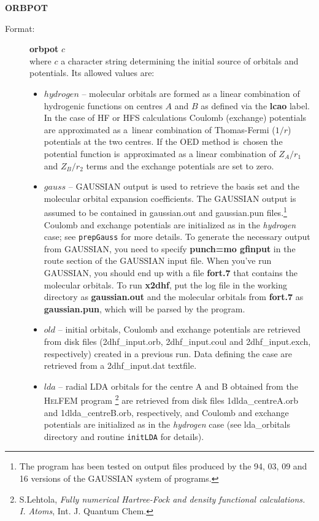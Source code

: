 \documentclass[12pt,a4paper]{article}
\newcommand{\ft}[1]{\texttt{#1}}
\begin{document}
\begin{description}
\item \textbf{ORBPOT}
\begin{description}
\item[Format:] \textbf{orbpot} $c$\\
  where $c$ a character string determining the initial source of
  orbitals and potentials. Its allowed values are:
\begin{itemize}
\item $hydrogen$ -- molecular orbitals are formed as a linear combination of hydrogenic
  functions on centres $A$ and $B$ as defined via the \textbf{lcao} label. In the case of
  HF or HFS calculations Coulomb (exchange) potentials are approximated as a~linear
  combination of Thomas-Fermi ($1/r$) potentials at the two centres. If the OED method
  is~chosen the potential function is~approximated as a linear combination of $Z_A/r_1$
  and $Z_B/r_2$ terms and the exchange potentials are set to zero.

\item $gauss$ -- GAUSSIAN output is used to retrieve the basis set and
  the molecular orbital expansion coefficients. The GAUSSIAN output is
  assumed to be contained in gaussian.out and gaussian.pun
  files.\footnote{The program has been tested on output files produced
    by the 94, 03, 09 and 16 versions of the GAUSSIAN system of
    programs.} Coulomb and exchange potentials are initialized as in
  the \textsl{hydrogen} case; see \ft{prepGauss} for more details.
  To generate the necessary output from GAUSSIAN, you need to specify
  {\bf punch=mo gfinput} in the route section of the GAUSSIAN input
  file. When you've run GAUSSIAN, you should end up with a file {\bf
    fort.7} that contains the molecular orbitals. To run {\bf x2dhf},
  put the log file in the working directory as {\bf gaussian.out} and
  the molecular orbitals from {\bf fort.7} as {\bf gaussian.pun},
  which will be parsed by the program.

\item $old$ -- initial orbitals, Coulomb and exchange potentials are retrieved from disk
  files (2dhf\_\-input.\-orb, 2dhf\_\-input.\-coul and 2dhf\_input.exch, respectively) created in
  a previous run. Data defining the case are retrieved from a 2dhf\_input.\-dat textfile.

\item $lda$ -- radial LDA orbitals for the centre A and B
  obtained from the \textsc{HelFEM} program%
\footnote{S.Lehtola, \textsl{Fully numerical Hartree-Fock and density functional
    calculations. I. Atoms}, Int. J. Quantum Chem. }
 are retrieved from disk files
  1dlda\-\_centreA.\-orb and 1dlda\-\_centreB.\-orb, respectively, and
  Coulomb and exchange potentials are initialized as in the
  \textsl{hydrogen} case (see lda\_orbitals directory and routine \ft{initLDA} for details).


\end{itemize}
\end{description}
\end{description}
\end{document}
